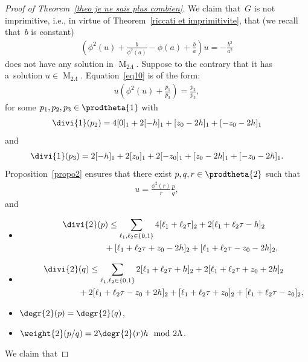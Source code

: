 \documentclass[pdftex]{sigma}
\numberwithin{equation}{section}
\begin{document}
\begin{proof}[Proof of Theorem~\ref{theo je ne sais plus combien}]
We claim that~$G$ is not imprimitive, i.e., in virtue of Theorem~\ref{riccati et imprimitivite}, that (we recall
that~$b$ is constant)
\begin{gather}
\label{eq10}
\left(\phi^{2}(u)+\frac{b}{\phi^{2}(a)}-\phi(a)+\frac{b}{a} \right)u=-\frac{b^{2}}{a^{2}}
\end{gather}
does not have any solution in $\operatorname{M}_{2\Lambda}$.
Suppose to the contrary that it has a~solution $u \in \operatorname{M}_{2\Lambda}$.
Equation~\eqref{eq10} is of the form:
\begin{gather*}
u\left(\phi^{2}(u)+\frac{p_{1}}{p_{3}}\right)=\frac{p_{2}}{p_{3}},
\end{gather*}
for some $p_{1},p_{2},p_{3}\in \prodtheta{1}$ with
\begin{gather*}
\divi{1} (p_{2})=4[0]_{1}+2[-h]_{1}+[z_{0}-2h]_{1}+[-z_{0}-2h]_{1}
\end{gather*}
and
\begin{gather*}
\divi{1} (p_{3})=2[-h]_{1}+2[z_{0}]_{1}+2[-z_{0}]_{1}+[z_{0}-2h]_{1}+[-z_{0}-2h]_{1}.
\end{gather*}
Proposition~\ref{propo2} ensures that there exist $p,q,r\in \prodtheta{2}$ such that
\begin{gather*}
u= \frac{\phi^{2}(r)}{r}\frac{p}{q},
\end{gather*}
and
\begin{itemize}
\itemsep=0pt
\item[(v)]
\begin{gather*}
 \divi{2} (p) \leq \sum\limits_{\ell_{1},\ell_{2} \in
\{0,1\}} 4[\ell_{1}+\ell_{2}\tau]_{2}+2[\ell_{1}+\ell_{2}\tau-h]_{2}
\\
\hphantom{\divi{2} (p) \leq}{} +[\ell_{1}+\ell_{2}\tau+z_{0}-2h]_{2}+[\ell_{1}+\ell_{2}\tau-z_{0}-2h]_{2},
\end{gather*}
\item[(vi)]
\begin{gather*}
 \divi{2} (q)  \leq \sum\limits_{\ell_{1},\ell_{2} \in
\{0,1\}} 2[\ell_{1}+\ell_{2}\tau+h]_{2}+2[\ell_{1}+\ell_{2}\tau+z_{0}+2h]_{2}
\\
\hphantom{\divi{2} (q)  \leq}{}
+2[\ell_{1}+\ell_{2}\tau-z_{0}+2h]_{2}
+[\ell_{1}+\ell_{2}\tau+z_{0}]_{2}+[\ell_{1}+\ell_{2}\tau-z_{0}]_{2},
\end{gather*}
\item[(vii)] $\degr{2} (p)=\degr{2} (q)$,
\item[(viii)] $\weight{2} (p/q)=2\degr{2} (r) h \mod 2\Lambda$.
\end{itemize}
We claim that

\end{proof}
\end{document}

